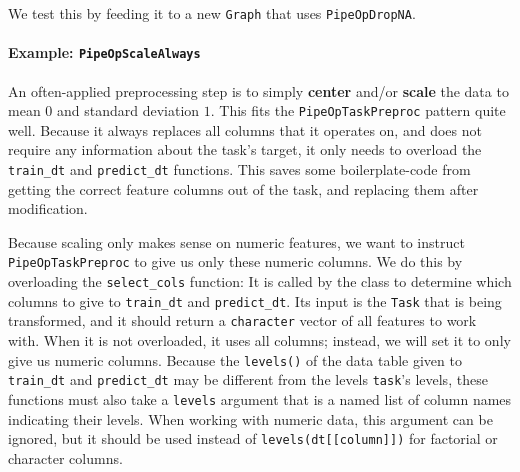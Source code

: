 \documentclass[]{article}
\newenvironment{Shaded}{}{}
\newcommand{\DecValTok}[1]{#1}
\newcommand{\KeywordTok}[1]{\textcolor[rgb]{0.00,0.00,1.00}{#1}}
\newcommand{\NormalTok}[1]{#1}
\newcommand{\OperatorTok}[1]{#1}
\newcommand{\StringTok}[1]{\textcolor[rgb]{0.00,0.50,0.50}{#1}}
\let\oldparagraph\paragraph
\renewcommand{\paragraph}[1]{\oldparagraph{#1}\mbox{}}
\renewenvironment{Shaded} {\begin{snugshade}\small} {\end{snugshade}}
\begin{document}
We test this by feeding it to a new \texttt{Graph} that uses \texttt{PipeOpDropNA}.

\begin{Shaded}
\end{Shaded}

\hypertarget{example-pipeopscalealways}{%
\paragraph{\texorpdfstring{Example: \texttt{PipeOpScaleAlways}}{Example: PipeOpScaleAlways}}\label{example-pipeopscalealways}}

An often-applied preprocessing step is to simply \textbf{center} and/or \textbf{scale} the data to mean \(0\) and standard deviation \(1\).
This fits the \texttt{PipeOpTaskPreproc} pattern quite well.
Because it always replaces all columns that it operates on, and does not require any information about the task's target, it only needs to overload the \texttt{train\_dt} and \texttt{predict\_dt} functions.
This saves some boilerplate-code from getting the correct feature columns out of the task, and replacing them after modification.

Because scaling only makes sense on numeric features, we want to instruct \texttt{PipeOpTaskPreproc} to give us only these numeric columns.
We do this by overloading the \texttt{select\_cols} function: It is called by the class to determine which columns to give to \texttt{train\_dt} and \texttt{predict\_dt}.
Its input is the \texttt{Task} that is being transformed, and it should return a \texttt{character} vector of all features to work with.
When it is not overloaded, it uses all columns; instead, we will set it to only give us numeric columns.
Because the \texttt{levels()} of the data table given to \texttt{train\_dt} and \texttt{predict\_dt} may be different from the levels \texttt{task}'s levels, these functions must also take a \texttt{levels} argument that is a named list of column names indicating their levels.
When working with numeric data, this argument can be ignored, but it should be used instead of \texttt{levels(dt{[}{[}column{]}{]})} for factorial or character columns.
\end{document}
